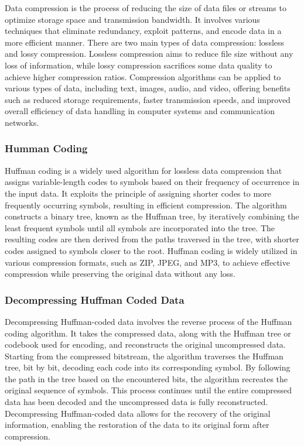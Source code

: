 Data compression is the process of reducing the size of data files or streams to optimize storage space and transmission bandwidth. It involves various techniques that eliminate redundancy, exploit patterns, 
and encode data in a more efficient manner. There are two main types of data compression: lossless and lossy compression. Lossless compression aims to reduce file size without any loss of information, while 
lossy compression sacrifices some data quality to achieve higher compression ratios. Compression algorithms can be applied to various types of data, including text, images, audio, and video, offering benefits 
such as reduced storage requirements, faster transmission speeds, and improved overall efficiency of data handling in computer systems and communication networks.

\subsubsection{Humman Coding}

Huffman coding is a widely used algorithm for lossless data compression that assigns variable-length codes to symbols based on their frequency of occurrence in the input data. It exploits the principle of 
assigning shorter codes to more frequently occurring symbols, resulting in efficient compression. The algorithm constructs a binary tree, known as the Huffman tree, by iteratively combining the least frequent 
symbols until all symbols are incorporated into the tree. The resulting codes are then derived from the paths traversed in the tree, with shorter codes assigned to symbols closer to the root. Huffman coding is 
widely utilized in various compression formats, such as ZIP, JPEG, and MP3, to achieve effective compression while preserving the original data without any loss.

\subsubsection{Decompressing Huffman Coded Data}

Decompressing Huffman-coded data involves the reverse process of the Huffman coding algorithm. It takes the compressed data, along with the Huffman tree or codebook used for encoding, and reconstructs the 
original uncompressed data. Starting from the compressed bitstream, the algorithm traverses the Huffman tree, bit by bit, decoding each code into its corresponding symbol. By following the path in the tree based 
on the encountered bits, the algorithm recreates the original sequence of symbols. This process continues until the entire compressed data has been decoded and the uncompressed data is fully reconstructed. 
Decompressing Huffman-coded data allows for the recovery of the original information, enabling the restoration of the data to its original form after compression.